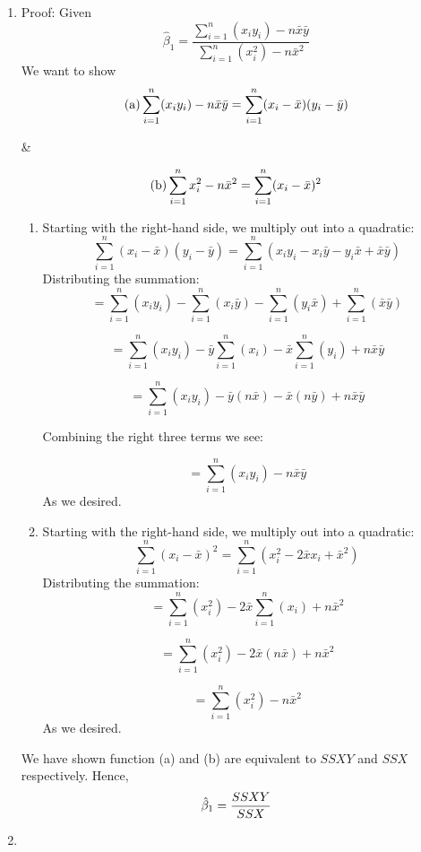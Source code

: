 \documentclass{article}
\begin{document}
\begin{enumerate}
    \item 
    Proof:
    Given $$\hat\beta_1=\frac{\sum_{i=1}^n(x_iy_i)-n\bar x\bar y}{\sum_{i=1}^n(x_i^2)-n\bar x^2}$$
    We want to show 
    $$\text{(a)}\space\sum_{i=1}^n(x_iy_i)-n\bar x\bar y=\sum_{i=1}^n(x_i-\bar x)(y_i-\bar y)$$
    
    \begin{center}
        \&
    \end{center}
    $$\text{(b)}\space\sum_{i=1}^nx^2_i-n\bar x^2=\sum_{i=1}^n(x_i-\bar x)^2$$

    \begin{enumerate}
        \item 
            Starting with the right-hand side, we multiply out into a quadratic:
            $$\sum_{i=1}^n(x_i-\bar x)(y_i-\bar y)=\sum_{i=1}^n(x_iy_i-x_i\bar y-y_i\bar x+\bar x\bar y)$$
            Distributing the summation:
            $$=\sum_{i=1}^n(x_iy_i)-\sum_{i=1}^n(x_i\bar y)-\sum_{i=1}^n(y_i\bar x)+\sum_{i=1}^n(\bar x\bar y)$$

            $$=\sum_{i=1}^n(x_iy_i)-
            \bar y\sum_{i=1}^n(x_i)-
            \bar x\sum_{i=1}^n(y_i)+
            n\bar x\bar y$$

            $$=\sum_{i=1}^n(x_iy_i)-
            \bar y(n\bar x)-
            \bar x(n\bar y)+
            n\bar x\bar y$$

            Combining the right three terms we see:
            
            $$=\sum_{i=1}^n(x_iy_i)-
            n\bar x\bar y$$
            As we desired.
        
        \item
            Starting with the right-hand side, we multiply out into a quadratic:
            $$\sum_{i=1}^n(x_i-\bar x)^2=\sum_{i=1}^n(x_i^2-2\bar x x_i+\bar x^2)$$
            Distributing the summation:
            $$=\sum_{i=1}^n(x_i^2)-2\bar x \sum_{i=1}^n(x_i)+n\bar x^2$$
            
            $$=\sum_{i=1}^n(x_i^2)-2\bar x (n\bar x)+n\bar x^2$$

            $$=\sum_{i=1}^n(x_i^2)-n\bar x^2$$
            As we desired.
    \end{enumerate}

        We have shown function (a) and (b) are equivalent to $SSXY$ and $SSX$ respectively.
        Hence, $$\hat\beta_1=\frac{SSXY}{SSX}\space$$
    
    \item


\end{enumerate}
\end{document}
